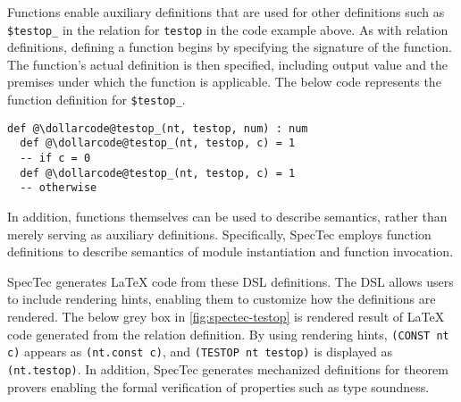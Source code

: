 Functions enable auxiliary definitions that are used for other definitions such
as \texttt{\$testop\_} in the relation for \texttt{testop} in the code example
above.
As with relation definitions, defining a function begins by specifying the
signature of the function.
The function's actual definition is then specified, including output value and
the premises under which the function is applicable.
The below code represents the function definition for \texttt{\$testop\_}.
\newpage
\begin{lstlisting}[style=dsl]
  def @\dollarcode@testop_(nt, testop, num) : num
  def @\dollarcode@testop_(nt, testop, c) = 1
  -- if c = 0
  def @\dollarcode@testop_(nt, testop, c) = 1
  -- otherwise
\end{lstlisting}
In addition, functions themselves can be used to describe semantics, rather
than merely serving as auxiliary definitions.
Specifically, SpecTec employs function definitions to describe semantics of module
instantiation and function invocation.


SpecTec generates LaTeX code from these DSL definitions.
The DSL allows users to include rendering hints, enabling them to customize how
the definitions are rendered.
The below grey box in \cref{fig:spectec-testop} is rendered result of
LaTeX code generated from the relation definition.
By using rendering hints, \texttt{(CONST nt c)} appears as \texttt{(nt.const
c)}, and \texttt{(TESTOP nt testop)} is displayed as \texttt{(nt.testop)}.
In addition, SpecTec generates mechanized definitions for theorem provers
enabling the formal verification of properties such as type soundness.

